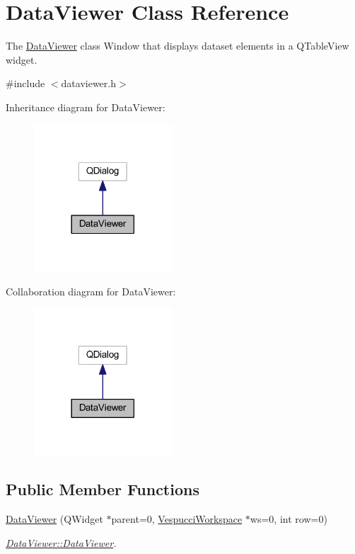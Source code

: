 \hypertarget{class_data_viewer}{\section{Data\+Viewer Class Reference}
\label{class_data_viewer}
}


The \hyperlink{class_data_viewer}{Data\+Viewer} class Window that displays dataset elements in a Q\+Table\+View widget.  




{\ttfamily \#include $<$dataviewer.\+h$>$}



Inheritance diagram for Data\+Viewer\+:\nopagebreak
\begin{figure}[H]
\begin{center}
\leavevmode
\includegraphics[width=146pt]{class_data_viewer__inherit__graph}
\end{center}
\end{figure}


Collaboration diagram for Data\+Viewer\+:\nopagebreak
\begin{figure}[H]
\begin{center}
\leavevmode
\includegraphics[width=146pt]{class_data_viewer__coll__graph}
\end{center}
\end{figure}
\subsection*{Public Member Functions}
\begin{DoxyCompactItemize}
\item 
\hyperlink{class_data_viewer_a661ade0bbf91ea10ab4ea1e718062c91}{Data\+Viewer} (Q\+Widget $\ast$parent=0, \hyperlink{class_vespucci_workspace}{Vespucci\+Workspace} $\ast$ws=0, int row=0)
\begin{DoxyCompactList}\small\item\em \hyperlink{class_data_viewer_a661ade0bbf91ea10ab4ea1e718062c91}{Data\+Viewer\+::\+Data\+Viewer}. \end{DoxyCompactList}\end{DoxyCompactItemize}



